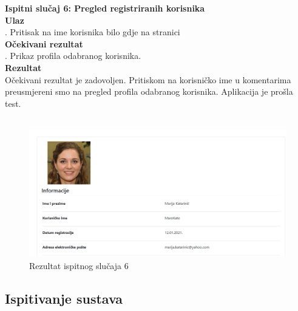 {			\noindent \textbf{Ispitni slučaj 6: Pregled registriranih korisnika}
			\\
			\textbf{Ulaz}
			\\
			. Pritisak na ime korisnika bilo gdje na stranici \\
			\textbf{Očekivani rezultat}
			\\
			. Prikaz profila odabranog korisnika. \\
			\textbf{Rezultat}
			\\
			\indent Očekivani rezultat je zadovoljen. Pritiskom na korisničko ime u komentarima preusmjereni smo na pregled profila odabranog korisnika. Aplikacija je prošla test.
			\\ \\
			\begin{figure}[H]
				\centering
				\includegraphics[scale=0.34]{"slike/test6"}
				\caption{Rezultat ispitnog slučaja 6}
				\label{fig:rezultat-ispitnog-slucaja-6}
			\end{figure}
			
			
		\subsection{Ispitivanje sustava}
			
}
